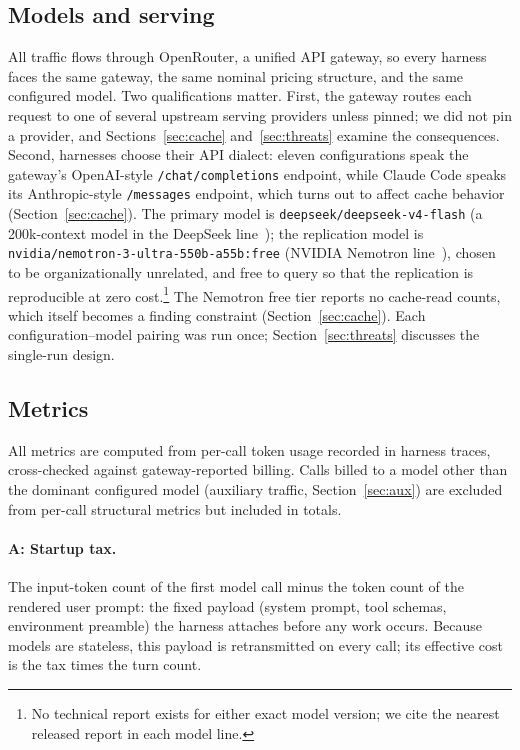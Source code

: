 \documentclass[11pt]{article}
\begin{document}
\subsection{Models and serving}
All traffic flows through OpenRouter, a unified API gateway, so every harness faces the same gateway, the same nominal pricing structure, and the same configured model. Two qualifications matter. First, the gateway routes each request to one of several upstream serving providers unless pinned; we did not pin a provider, and Sections~\ref{sec:cache} and~\ref{sec:threats} examine the consequences. Second, harnesses choose their API dialect: eleven configurations speak the gateway's OpenAI-style \texttt{/chat/completions} endpoint, while Claude Code speaks its Anthropic-style \texttt{/messages} endpoint, which turns out to affect cache behavior (Section~\ref{sec:cache}). The primary model is \texttt{deepseek/deepseek-v4-flash} (a 200k-context model in the DeepSeek line~\citep{deepseek2024v3}); the replication model is \texttt{nvidia/nemotron-3-ultra-550b-a55b:free} (NVIDIA Nemotron line~\citep{nvidia2024nemotron}), chosen to be organizationally unrelated, and free to query so that the replication is reproducible at zero cost.\footnote{No technical report exists for either exact model version; we cite the nearest released report in each model line.} The Nemotron free tier reports no cache-read counts, which itself becomes a finding constraint (Section~\ref{sec:cache}). Each configuration--model pairing was run once; Section~\ref{sec:threats} discusses the single-run design.

\subsection{Metrics}
\label{sec:metrics}
All metrics are computed from per-call token usage recorded in harness traces, cross-checked against gateway-reported billing. Calls billed to a model other than the dominant configured model (auxiliary traffic, Section~\ref{sec:aux}) are excluded from per-call structural metrics but included in totals.

\paragraph{A: Startup tax.} The input-token count of the first model call minus the token count of the rendered user prompt: the fixed payload (system prompt, tool schemas, environment preamble) the harness attaches before any work occurs. Because models are stateless, this payload is retransmitted on every call; its effective cost is the tax times the turn count.
\end{document}
